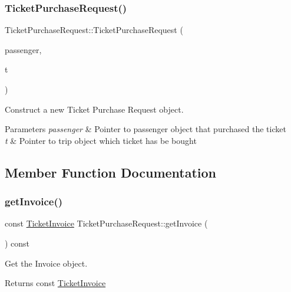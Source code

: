 \subsubsection{\texorpdfstring{Ticket\+Purchase\+Request()}{TicketPurchaseRequest()}}
{\footnotesize\ttfamily Ticket\+Purchase\+Request\+::\+Ticket\+Purchase\+Request (\begin{DoxyParamCaption}\item[{\mbox{\hyperlink{classPassenger}{Passenger}} $\ast$}]{passenger,  }\item[{\mbox{\hyperlink{classTrip}{Trip}} $\ast$}]{t }\end{DoxyParamCaption})}



Construct a new Ticket Purchase Request object. 


\begin{DoxyParams}{Parameters}
{\em passenger} & Pointer to passenger object that purchased the ticket \\
\hline
{\em t} & Pointer to trip object which ticket has be bought \\
\hline
\end{DoxyParams}


\subsection{Member Function Documentation}
\mbox{\label{classTicketPurchaseRequest_a24d2aab14853b8f7c8f5487145f3d26e}} 
\subsubsection{\texorpdfstring{get\+Invoice()}{getInvoice()}}
{\footnotesize\ttfamily const \mbox{\hyperlink{classTicketInvoice}{Ticket\+Invoice}} Ticket\+Purchase\+Request\+::get\+Invoice (\begin{DoxyParamCaption}{ }\end{DoxyParamCaption}) const}



Get the Invoice object. 

\begin{DoxyReturn}{Returns}
const \mbox{\hyperlink{classTicketInvoice}{Ticket\+Invoice}} 
\end{DoxyReturn}
\mbox{\label{classTicketPurchaseRequest_a08428a7617aa26c16702420e61ce0312}} 
